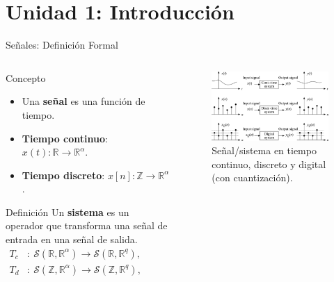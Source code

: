 \documentclass[
    10pt,
    aspectratio=169,
    xcolor={dvipsnames},
    spanish,
    ]{beamer}
\begin{document}
\section{Unidad 1: Introducción}
\begin{frame}{Señales: Definición Formal}
\begin{columns}[T,onlytextwidth]
  \begin{column}{0.5\textwidth}
    \begin{block}{Concepto}
    \begin{itemize}
      \item Una \textbf{señal} es una función de tiempo.
      \item \textbf{Tiempo continuo}: \(x(t): \mathbb{R} \rightarrow \mathbb{R}^{\alpha}\).
      \item \textbf{Tiempo discreto}: \(x[n]: \mathbb{Z} \rightarrow \mathbb{R}^{\alpha}\).
    \end{itemize}
    \end{block}

    \begin{block}{Definición}
      \footnotesize
    Un \textbf{sistema} es un operador que transforma una señal de entrada en una señal de salida.
    \[
    \begin{aligned}
    T_c&:\ \mathcal{S}(\mathbb{R},\mathbb{R}^{\alpha}) \to \mathcal{S}(\mathbb{R},\mathbb{R}^{q}),
    &\qquad y(t)&=(T_c\{x\})(t),\\[3pt]
    T_d&:\ \mathcal{S}(\mathbb{Z},\mathbb{R}^{\alpha}) \to \mathcal{S}(\mathbb{Z},\mathbb{R}^{q}),
    &\qquad y[n]&=(T_d\{x\})(n).
    \end{aligned}
    \]
    \end{block}
  \end{column}

  \begin{column}{0.45\textwidth}
    \begin{figure}
      \centering
      \includegraphics[width=1\linewidth]{Figura_5.png}
      \caption{\scriptsize Señal/sistema en tiempo continuo, discreto y digital (con cuantización).}
    \end{figure}
  \end{column}
\end{columns}
\end{frame}
\end{document}
